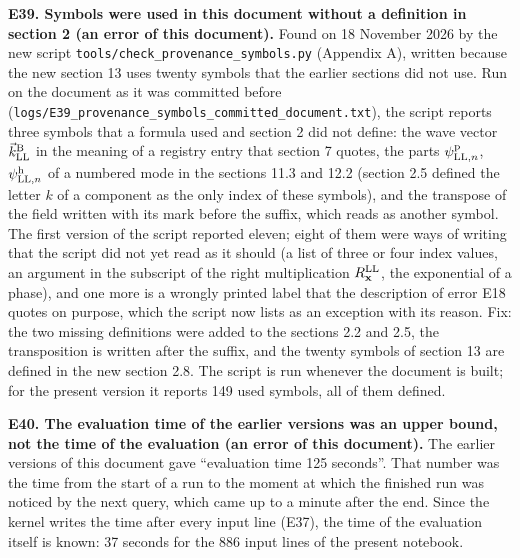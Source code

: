 \documentclass[
  10pt,
]{article}
\begin{document}
\textbf{E39. Symbols were used in this document without a definition in
section 2 (an error of this document).} Found on 18 November 2026 by the
new script \texttt{tools/check\_provenance\_symbols.py} (Appendix A),
written because the new section 13 uses twenty symbols that the earlier
sections did not use. Run on the document as it was committed before
(\texttt{logs/E39\_provenance\_symbols\_committed\_document.txt}), the
script reports three symbols that a formula used and section 2 did not
define: the wave vector \(\vec k^{\rm B}_{\rm LL}\) in the meaning of a
registry entry that section 7 quotes, the parts
\(\psi^{\rm p}_{{\rm LL},n}\), \(\psi^{\rm h}_{{\rm LL},n}\) of a
numbered mode in the sections 11.3 and 12.2 (section 2.5 defined the
letter \(k\) of a component as the only index of these symbols), and the
transpose of the field written with its mark before the suffix, which
reads as another symbol. The first version of the script reported
eleven; eight of them were ways of writing that the script did not yet
read as it should (a list of three or four index values, an argument in
the subscript of the right multiplication \(R^{\rm LL}_{\mathbf x}\),
the exponential of a phase), and one more is a wrongly printed label
that the description of error E18 quotes on purpose, which the script
now lists as an exception with its reason. Fix: the two missing
definitions were added to the sections 2.2 and 2.5, the transposition is
written after the suffix, and the twenty symbols of section 13 are
defined in the new section 2.8. The script is run whenever the document
is built; for the present version it reports 149 used symbols, all of
them defined.

\textbf{E40. The evaluation time of the earlier versions was an upper
bound, not the time of the evaluation (an error of this document).} The
earlier versions of this document gave ``evaluation time 125 seconds''.
That number was the time from the start of a run to the moment at which
the finished run was noticed by the next query, which came up to a
minute after the end. Since the kernel writes the time after every input
line (E37), the time of the evaluation itself is known: 37 seconds for
the 886 input lines of the present notebook.
\end{document}
